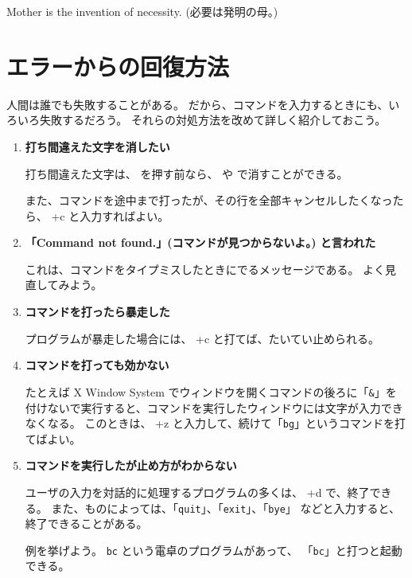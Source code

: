 \begin{progls}
Mother is the invention of necessity. (必要は発明の母。)
%
\end{progls}

\newpage

\section{エラーからの回復方法}

人間は誰でも失敗することがある。
だから、コマンドを入力するときにも、いろいろ失敗するだろう。
それらの対処方法を改めて詳しく紹介しておこう。

\begin{enumerate}
\item \textbf{打ち間違えた文字を消したい}

打ち間違えた文字は、 \retrn を押す前なら、
  や  で消すことができる。

また、コマンドを途中まで打ったが、その行を全部キャンセルしたくなったら、
 +c と入力すればよい。

\item \textbf{「Command not found.」(コマンドが見つからないよ。) と言われた}

これは、コマンドをタイプミスしたときにでるメッセージである。
よく見直してみよう。

\item \textbf{コマンドを打ったら暴走した}

プログラムが暴走した場合には、 +c と打てば、たいてい止められる。

\item \textbf{コマンドを打っても効かない}

たとえば X Window System でウィンドウを開くコマンドの後ろに「\texttt{\&}」を
付けないで実行すると、コマンドを実行したウィンドウには文字が入力できなくなる。
このときは、 +z と入力して、続けて「\texttt{bg}」というコマンドを打てばよい。

\item \textbf{コマンドを実行したが止め方がわからない}

ユーザの入力を対話的に処理するプログラムの多くは、
 +d で、終了できる。
また、ものによっては、「\texttt{quit}」、「\texttt{exit}」、「\texttt{bye}」
などと入力すると、終了できることがある。

例を挙げよう。
\texttt{bc} という電卓のプログラムがあって、
「\texttt{bc}」と打つと起動できる。


\end{enumerate}
